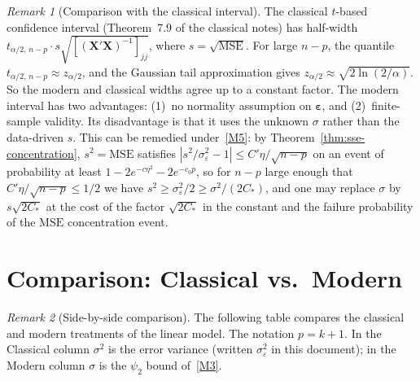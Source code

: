 \documentclass[14pt]{extarticle}
\theoremstyle{plain}
\theoremstyle{definition}
\theoremstyle{remark}
\newtheorem*{remark}{Remark}
\newcommand{\MSE}{\mathrm{MSE}}
\newcommand{\bX}{\mathbf{X}}
\newcommand{\be}{\boldsymbol{\varepsilon}}
\begin{document}
\begin{remark}[Comparison with the classical interval]
The classical $t$-based confidence interval (Theorem~7.9 of the classical notes) has half-width $t_{\alpha/2,\,n-p}\cdot s\sqrt{[(\bX'\bX)^{-1}]_{jj}}$, where $s = \sqrt{\MSE}$. For large $n - p$, the quantile $t_{\alpha/2,\,n-p} \approx z_{\alpha/2}$, and the Gaussian tail approximation gives $z_{\alpha/2} \approx \sqrt{2\ln(2/\alpha)}$. So the modern and classical widths agree up to a constant factor. The modern interval has two advantages: (1)~no normality assumption on $\be$, and (2)~finite-sample validity. Its disadvantage is that it uses the unknown $\sigma$ rather than the data-driven $s$. This can be remedied under~\ref{M5}: by Theorem~\ref{thm:sse-concentration}, $s^2 = \MSE$ satisfies $|s^2/\sigma_\varepsilon^2 - 1| \leqslant C'\eta/\sqrt{n-p}$ on an event of probability at least $1 - 2e^{-c\eta^2} - 2e^{-c_0p}$, so for $n - p$ large enough that $C'\eta/\sqrt{n-p} \leqslant 1/2$ we have $s^2 \geqslant \sigma_\varepsilon^2/2 \geqslant \sigma^2/(2C_*)$, and one may replace $\sigma$ by $s\sqrt{2C_*}$ at the cost of the factor $\sqrt{2C_*}$ in the constant and the failure probability of the $\MSE$ concentration event.
\end{remark}

\section{Comparison: Classical vs.\ Modern}\label{sec:comparison}

\begin{remark}[Side-by-side comparison]
The following table compares the classical and modern treatments of the linear model. The notation $p = k+1$. In the Classical column $\sigma^2$ is the error variance (written $\sigma_\varepsilon^2$ in this document); in the Modern column $\sigma$ is the $\psi_2$ bound of~\ref{M3}.
\end{remark}
\end{document}
